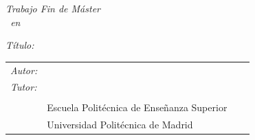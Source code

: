 \begin{titlepage}
\vspace*{4cm}

\noindent
\textit{Trabajo Fin de Máster}\\
\textit{\Estudios\ en \TituloEstudios}

\begin{minipage}[t]{0.1\linewidth}
  \textit{Título:}
\end{minipage}
\begin{minipage}[t]{0.88\linewidth}
  \TituloTFM
\end{minipage}

\Fecha

\vspace*{4cm}

\noindent
\begin{tabular}{lp{0.85\linewidth}}
  \textit{Autor:}   & \NombreAutor{}   \\
  \textit{Tutor:}   & \NombreTutor{}   \\
                    & \Departamento{} \\
                    & Escuela Politécnica de Enseñanza Superior\\
                    & Universidad Politécnica de Madrid
\end{tabular}
\end{titlepage}
